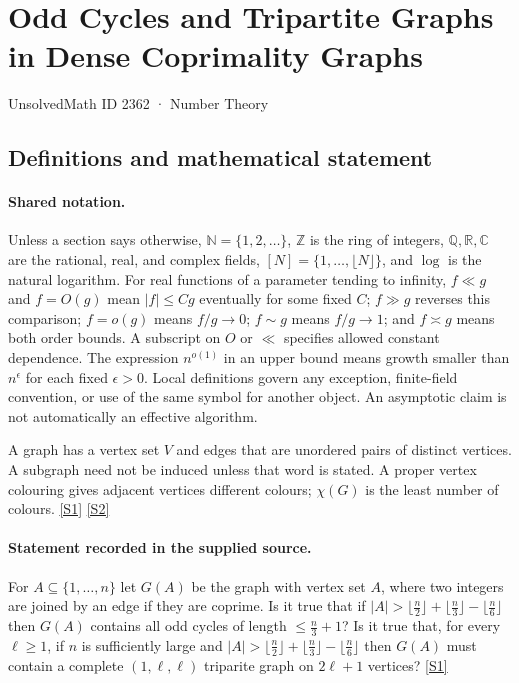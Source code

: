\documentclass[11pt,a4paper]{article}
\newcommand{\N}{\mathbb{N}}
\newcommand{\Z}{\mathbb{Z}}
\newcommand{\Q}{\mathbb{Q}}
\newcommand{\R}{\mathbb{R}}
\newcommand{\C}{\mathbb{C}}
\newcommand{\sref}[2]{\hyperlink{source:#1:#2}{[S#2]}}
\begin{document}

\setcounter{section}{2361}

\section{Odd Cycles and Tripartite Graphs in Dense Coprimality Graphs}\label{2362}

{\small\sffamily UnsolvedMath ID 2362 · Number Theory}

\subsection{Definitions and mathematical statement}

\paragraph{Shared notation.}Unless a section says otherwise, $\N=\{1,2,\ldots\}$,
$\Z$ is the ring of integers, $\Q,\R,\C$ are the rational, real, and complex
fields, $[N]=\{1,\ldots,\lfloor N\rfloor\}$, and $\log$ is the natural
logarithm. For real functions of a parameter tending to infinity,
$f\ll g$ and $f=O(g)$ mean $|f|\leq Cg$ eventually for some fixed $C$;
$f\gg g$ reverses this comparison; $f=o(g)$ means $f/g\to0$;
$f\sim g$ means $f/g\to1$; and $f\asymp g$ means both order bounds.
A subscript on $O$ or $\ll$ specifies allowed constant dependence.
The expression $n^{o(1)}$ in an upper bound means growth smaller than
$n^\epsilon$ for each fixed $\epsilon>0$. Local definitions govern any
exception, finite-field convention, or use of the same symbol for another
object. An asymptotic claim is not automatically an effective algorithm.



A graph has a vertex set $V$ and edges that are unordered pairs of distinct vertices. A subgraph need not be induced unless that word is stated. A proper vertex colouring gives adjacent vertices different colours; $\chi(G)$ is the least number of colours. \sref{2362}{1} \sref{2362}{2}

\paragraph{Statement recorded in the supplied source.}
For $A\subseteq \{1,\ldots,n\}$ let $G(A)$ be the graph with vertex set $A$, where two integers are joined by an edge if they are coprime.
Is it true that if $ \lvert A\rvert >\lfloor\tfrac{n}{2}\rfloor+\lfloor\tfrac{n}{3}\rfloor-\lfloor\tfrac{n}{6}\rfloor $ then $G(A)$ contains all odd cycles of length $\leq \frac{n}{3}+1$?
Is it true that, for every $\ell\geq 1$, if $n$ is sufficiently large and $ \lvert A\rvert >\lfloor\tfrac{n}{2}\rfloor+\lfloor\tfrac{n}{3}\rfloor-\lfloor\tfrac{n}{6}\rfloor $ then $G(A)$ must contain a complete $(1,\ell,\ell)$ triparite graph on $2\ell+1$ vertices? \sref{2362}{1}
\end{document}
